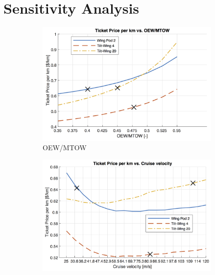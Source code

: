 \newpage
\chapter{Sensitivity Analysis} \label{ch:sensitivity}



\begin{figure}[H]
\begin{subfigure}[t]{0.33\textwidth}
    \centering
    \includegraphics[width=\textwidth]{Figures/OEWMTOW_TPrice_perkmNOPAD.png}
    \captionsetup{width=.8\linewidth}
    \caption{OEW/MTOW}
    \label{fig:sens1}
\end{subfigure}
\begin{subfigure}[t]{0.33\textwidth}
    \centering
    \includegraphics[width=\textwidth]{Figures/Cruise_TPrice_perkmNOPAD.png}
    \captionsetup{width=.8\linewidth}
    \caption{}
    \label{fig:sens2}

\end{subfigure}
\end{figure}
